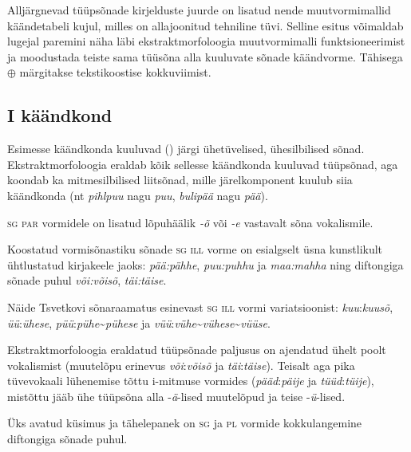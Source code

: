 \documentclass[12pt,a4paper]{article}
\newcommand{\vadja}[1]{\textit{#1}}
\newcommand{\msd}[1]{\textsc{#1}}
\begin{document}

Alljärgnevad tüüpsõnade kirjelduste juurde on lisatud nende muutvormimallid käände\-tabeli kujul, milles on alla\-joonitud tehniline tüvi. Selline esitus võimaldab lugejal paremini näha läbi ekstrakt\-morfoloogia muutvormimalli funktsioneerimist ja moodustada teiste sama tüüsõna alla kuuluvate sõnade käändvorme. Tähisega $\oplus$ märgitakse teksti\-koostise kokku\-viimist.

\subsection{\RN{1} käändkond}

Esimesse käändkonda kuuluvad (\cite[40]{ariste_grammar_1968}) järgi ühetüvelised, ühesilbilised sõnad. Ekstraktmorfoloogia eraldab kõik sellesse käändkonda kuuluvad tüüpsõnad, aga koondab ka mitmesilbilised liitsõnad, mille järelkomponent kuulub siia käändkonda (nt \vadja{pihlpuu} nagu \vadja{puu}, \vadja{bulipää} nagu \vadja{pää}).

\msd{sg par} vormidele on lisatud lõpuhäälik \textit{-õ} või \textit{-e} vastavalt sõna vokalismile.

Koostatud vormisõnastiku sõnade \msd{sg ill} vorme on esialgselt üsna kunstlikult ühtlustatud kirjakeele jaoks: \textit{pää:pähhe}, \textit{puu:puhhu} ja \textit{maa:mahha} ning diftongiga sõnade puhul \textit{või:võisõ}, \textit{täi:täise}.

Näide Tsvetkovi sõnaraamatus esinevast \msd{sg ill} vormi variatsioonist: \vadja{kuu}:\vadja{kuusõ}, \vadja{üü}:\vadja{ühese}, \vadja{püü}:\vadja{pühe}\textasciitilde \vadja{pühese} ja \vadja{vüü}:\vadja{vühe}\textasciitilde \vadja{vühese}\textasciitilde \vadja{vüüse}.

Ekstraktmorfoloogia eraldatud tüüpsõnade paljusus on ajendatud ühelt poolt vokalismist (muutelõpu erinevus \textit{või}:\textit{võisõ} ja \textit{täi}:\textit{täise}). Teisalt aga pika tüve\-vokaali lühenemise tõttu i-mitmuse vormides (\textit{pääd}:\textit{päije} ja \textit{tüüd}:\textit{tüije}), mistõttu jääb ühe tüüpsõna alla -\textit{ä}-lised muutelõpud ja teise -\textit{ü}-lised.

Üks avatud küsimus ja tähelepanek on \msd{sg} ja \msd{pl} vormide kokkulangemine diftongiga sõnade puhul.
\end{document}

